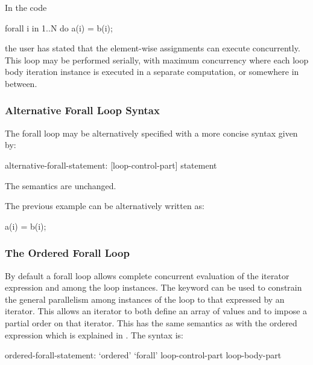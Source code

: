 \begin{example}
In the code
\begin{chapel}
forall i in 1..N do
  a(i) = b(i);
\end{chapel}
the user has stated that the element-wise assignments can execute
concurrently.  This loop may be performed serially, with maximum
concurrency where each loop body iteration instance is executed in a
separate computation, or somewhere in between.
\end{example}

\subsubsection{Alternative Forall Loop Syntax}
\label{Alternative_Forall_Loop_Syntax}

The forall loop may be alternatively specified with a more concise
syntax given by:
\begin{syntax}
alternative-forall-statement:
  [loop-control-part] statement
\end{syntax}
The semantics are unchanged.

\begin{example}
The previous  example can be alternatively written as:
\begin{chapel}
[i in 1..N] a(i) = b(i);
\end{chapel}
\end{example}

\subsubsection{The Ordered Forall Loop}
\label{Ordered_Forall}

By default a forall loop allows complete concurrent evaluation of the
iterator expression and among the loop instances. The
keyword  can be used to constrain the general
parallelism among instances of the loop to that expressed by an
iterator. This allows an iterator to both define an array of values
and to impose a partial order on that iterator.  This has the same
semantics as with the ordered expression which is explained
in .  The syntax is:
\begin{syntax}
ordered-forall-statement:
   `ordered' `forall' loop-control-part loop-body-part
\end{syntax}


